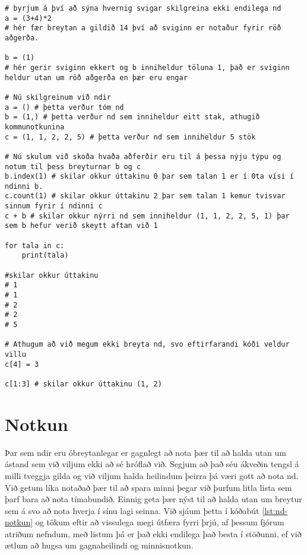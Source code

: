 \begin{lstlisting}[caption=Ndir skilgreindar, label=lst:ndir-kynntar]
# byrjum á því að sýna hvernig svigar skilgreina ekki endilega nd
a = (3+4)*2
# hér fær breytan a gildið 14 því að sviginn er notaður fyrir röð aðgerða.

b = (1)
# hér gerir sviginn ekkert og b inniheldur töluna 1, það er sviginn heldur utan um röð aðgerða en þær eru engar

# Nú skilgreinum við ndir
a = () # þetta verður tóm nd
b = (1,) # þetta verður nd sem inniheldur eitt stak, athugið kommunotkunina
c = (1, 1, 2, 2, 5) # þetta verður nd sem inniheldur 5 stök

# Nú skulum við skoða hvaða aðferðir eru til á þessa nýju týpu og notum til þess breyturnar b og c
b.index(1) # skilar okkur úttakinu 0 þar sem talan 1 er í 0ta vísi í ndinni b.
c.count(1) # skilar okkur úttakinu 2 þar sem talan 1 kemur tvisvar sinnum fyrir í ndinni c
c + b # skilar okkur nýrri nd sem inniheldur (1, 1, 2, 2, 5, 1) þar sem b hefur verið skeytt aftan við 1

for tala in c:
	print(tala)
	
#skilar okkur úttakinu
# 1
# 1
# 2
# 2
# 5

# Athugum að við megum ekki breyta nd, svo eftirfarandi kóði veldur villu
c[4] = 3

c[1:3] # skilar okkur úttakinu (1, 2)
\end{lstlisting}

\section{Notkun}
Þar sem ndir eru óbreytanlegar er gagnlegt að nota þær til að halda utan um ástand sem við viljum ekki að sé hróflað við.
Segjum að það séu ákveðin tengsl á milli tveggja gilda og við viljum halda heilindum þeirra þá væri gott að nota nd.
Við getum líka notaðað þær til að spara minni þegar við þurfum litla lista sem þarf bara að nota tímabundið.
Einnig geta þær nýst til að halda utan um breytur sem á svo að nota hverja í sínu lagi seinna.
Við sjáum þetta í kóðabút \ref{lst:nd-notkun} og tökum eftir að vissulega megi útfæra fyrri þrjú, af þessum fjórum atriðum nefndum, með listum þá er það ekki endilega það besta í stöðunni, ef við ætlum að hugsa um gagnaheilindi og minnisnotkun.

